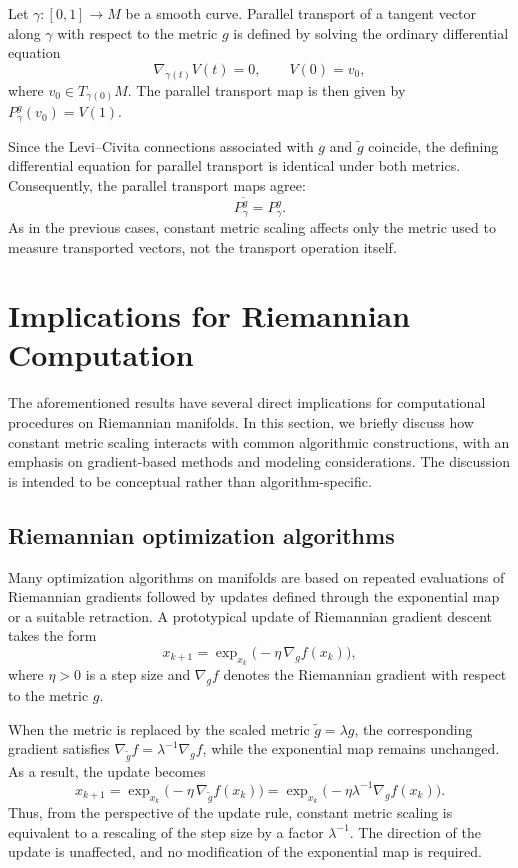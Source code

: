 \documentclass[11pt]{article}
\begin{document}
Let $\gamma : [0,1] \to M$ be a smooth curve. Parallel transport of a tangent
vector along $\gamma$ with respect to the metric $g$ is defined by solving the
ordinary differential equation
\[
\nabla_{\dot\gamma(t)} V(t) = 0,
\qquad V(0) = v_0,
\]
where $v_0 \in T_{\gamma(0)} M$. The parallel transport map is then given by
$P_\gamma^g(v_0) = V(1)$.

Since the Levi--Civita connections associated with $g$ and $\tilde g$ coincide,
the defining differential equation for parallel transport is identical under
both metrics. Consequently, the parallel transport maps agree:
\[
P_\gamma^{\tilde g} = P_\gamma^g.
\]
As in the previous cases, constant metric scaling affects only the metric used to
measure transported vectors, not the transport operation itself.

\section{Implications for Riemannian Computation}

The aforementioned results have several direct implications for
computational procedures on Riemannian manifolds. In this section, we briefly
discuss how constant metric scaling interacts with common algorithmic
constructions, with an emphasis on gradient-based methods and modeling
considerations. The discussion is intended to be conceptual rather than
algorithm-specific.

\subsection{Riemannian optimization algorithms}

Many optimization algorithms on manifolds are based on repeated evaluations of
Riemannian gradients followed by updates defined through the exponential map or
a suitable retraction. A prototypical update of Riemannian gradient descent
takes the form
\[
x_{k+1} = \exp_{x_k}\bigl(-\eta \, \nabla_g f(x_k)\bigr),
\]
where $\eta > 0$ is a step size and $\nabla_g f$ denotes the Riemannian gradient
with respect to the metric $g$.

When the metric is replaced by the scaled metric $\tilde g = \lambda g$, the
corresponding gradient satisfies $\nabla_{\tilde g} f = \lambda^{-1}
\nabla_g f$, while the exponential map remains unchanged. As a result, the
update becomes
\[
x_{k+1}
= \exp_{x_k}\bigl(-\eta \, \nabla_{\tilde g} f(x_k)\bigr)
= \exp_{x_k}\bigl(-\eta \lambda^{-1} \nabla_g f(x_k)\bigr).
\]
Thus, from the perspective of the update rule, constant metric scaling is
equivalent to a rescaling of the step size by a factor $\lambda^{-1}$. The
direction of the update is unaffected, and no modification of the exponential
map is required.
\end{document}
